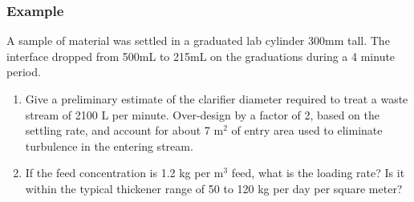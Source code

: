 \begin{frame}\frametitle{Example}
 	A sample of material was settled in a graduated lab cylinder 300mm tall. The interface dropped from 500mL to 215mL on the graduations during a 4 minute period.

	\begin{enumerate}
		\item	Give a preliminary estimate of the clarifier diameter required to treat a waste stream of 2100 L per minute. Over-design by a factor of 2, based on the settling rate, and account for about 7 $\text{m}^2$ of entry area used to eliminate turbulence in the entering stream.
		\item	If the feed concentration is 1.2 kg per $\text{m}^3$ feed, what is the loading rate? Is it within the typical thickener range of 50 to 120 kg per day per square meter? 
	\end{enumerate}
\iftoggle{instructor}{	{\color{myGreen}{Answers}}:
	\begin{enumerate}
		\item	Settling rate = 171 mm per 4 minutes = 42.8 mm/min.\\Area = $\displaystyle \frac{2.1~\text{m}^3.\text{min}^{-1}}{\left(\frac{1}{2}\right)\left(42.8 \times 10^{-3} \text{m}.\text{min}^{-1}\right)} = 98 + 7 \text{m}^2$
		\item	$\psi = C_0 v = 1.2 \displaystyle\frac{\text{kg}}{\text{m}^3} \cdot 0.0428 \displaystyle \frac{\text{m}}{\text{min}} \cdot \displaystyle\frac{60 \times 24 \text{min}}{\text{day}} = 74 \displaystyle \frac{\text{kg}}{\text{day}.\text{m}^2}$
	\end{enumerate}
}{}
\end{frame}

